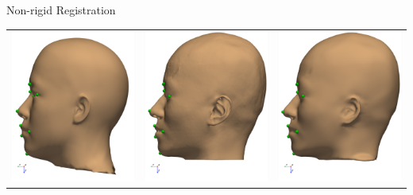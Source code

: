 \documentclass{beamer}
\begin{document}
\begin{frame}{Non-rigid Registration}
\begin{table}
\begin{tabular}{ccc}
      \includegraphics[height = 0.29 \linewidth]{fig/source-face-side.pdf}  & \includegraphics[height = 0.29 \linewidth]{fig/target-face-side.pdf}  & \includegraphics[height = 0.29 \linewidth]{fig/result-face-side.pdf}  \\
    \end{tabular}
  \end{table}
\end{frame}
\end{document}
